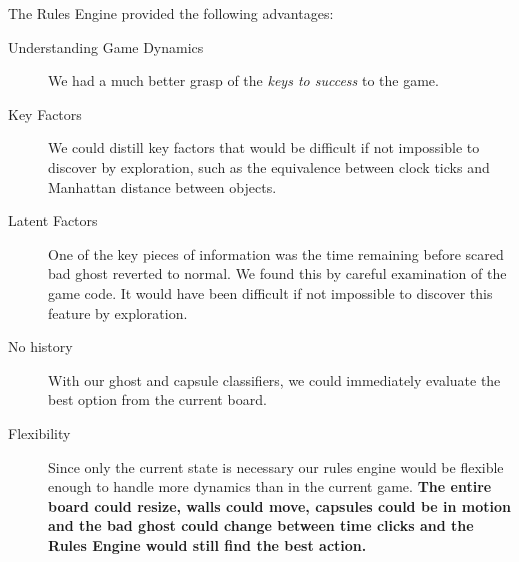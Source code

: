 \documentclass[11pt, oneside]{article}   	%
\begin{document}
The Rules Engine provided the following advantages:
\begin{description}
	\item[Understanding Game Dynamics]We had a much better grasp of the \emph{keys to success} to the game.
	\item[Key Factors]We could distill key factors that would be difficult if not impossible to discover by exploration, such as the equivalence between clock ticks and Manhattan distance between objects.
	\item[Latent Factors]One of the key pieces of information was the time remaining before scared bad ghost reverted to normal. We found this by careful examination of the game code. It would have been difficult if not impossible to discover this feature by exploration.
	\item[No history]With our ghost and capsule classifiers, we could immediately evaluate the best option from the current board.
	\item[Flexibility]Since only the current state is necessary our rules engine would be flexible enough to handle more dynamics than in the current game. \bf{The entire board could resize,  walls could move, capsules could be in motion and the bad ghost could change between time clicks and the Rules Engine would still find the best action.}
\end{description}
\end{document}
